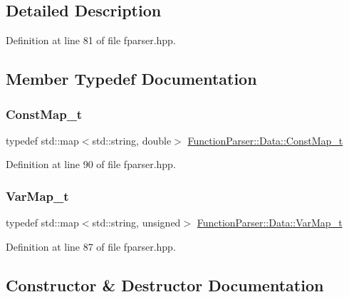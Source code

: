 \subsection{Detailed Description}


Definition at line 81 of file fparser.\+hpp.



\subsection{Member Typedef Documentation}
\mbox{\label{struct_function_parser_1_1_data_a74ff90f5d1687b68363d1602ef0ccece}} 
\subsubsection{\texorpdfstring{Const\+Map\+\_\+t}{ConstMap\_t}}
{\footnotesize\ttfamily typedef std\+::map$<$std\+::string, double$>$ \hyperlink{struct_function_parser_1_1_data_a74ff90f5d1687b68363d1602ef0ccece}{Function\+Parser\+::\+Data\+::\+Const\+Map\+\_\+t}}



Definition at line 90 of file fparser.\+hpp.

\mbox{\label{struct_function_parser_1_1_data_a02f3fbca3164d0e498312b418258ea84}} 
\subsubsection{\texorpdfstring{Var\+Map\+\_\+t}{VarMap\_t}}
{\footnotesize\ttfamily typedef std\+::map$<$std\+::string, unsigned$>$ \hyperlink{struct_function_parser_1_1_data_a02f3fbca3164d0e498312b418258ea84}{Function\+Parser\+::\+Data\+::\+Var\+Map\+\_\+t}}



Definition at line 87 of file fparser.\+hpp.



\subsection{Constructor \& Destructor Documentation}
\mbox{\label{struct_function_parser_1_1_data_a2f7002e4cc588de6091472be924689b0}} 
